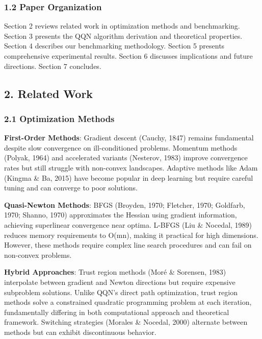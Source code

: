 \hypertarget{paper-organization}{%
\subsubsection{1.2 Paper Organization}\label{paper-organization}}

Section 2 reviews related work in optimization methods and benchmarking.
Section 3 presents the QQN algorithm derivation and theoretical properties.
Section 4 describes our benchmarking methodology.
Section 5 presents comprehensive experimental results.
Section 6 discusses implications and future directions.
Section 7 concludes.

\hypertarget{related-work}{%
\subsection{2. Related Work}\label{related-work}}

\hypertarget{optimization-methods}{%
\subsubsection{2.1 Optimization Methods}\label{optimization-methods}}

\textbf{First-Order Methods}: Gradient descent (Cauchy, 1847) remains fundamental despite slow convergence on ill-conditioned problems.
Momentum methods (Polyak, 1964) and accelerated variants (Nesterov, 1983) improve convergence rates but still struggle with non-convex landscapes.
Adaptive methods like Adam (Kingma \& Ba, 2015) have become popular in deep learning but require careful tuning and can converge to poor solutions.

\textbf{Quasi-Newton Methods}: BFGS (Broyden, 1970; Fletcher, 1970; Goldfarb, 1970; Shanno, 1970) approximates the Hessian using gradient information, achieving superlinear convergence near optima.
L-BFGS (Liu \& Nocedal, 1989) reduces memory requirements to O(mn), making it practical for high dimensions.
However, these methods require complex line search procedures and can fail on non-convex problems.

\textbf{Hybrid Approaches}: Trust region methods (Moré \& Sorensen, 1983) interpolate between gradient and Newton directions but require expensive subproblem solutions.
Unlike QQN's direct path optimization, trust region methods solve a constrained quadratic programming problem at each iteration, fundamentally differing in both computational approach and theoretical framework.
Switching strategies (Morales \& Nocedal, 2000) alternate between methods but can exhibit discontinuous behavior.

